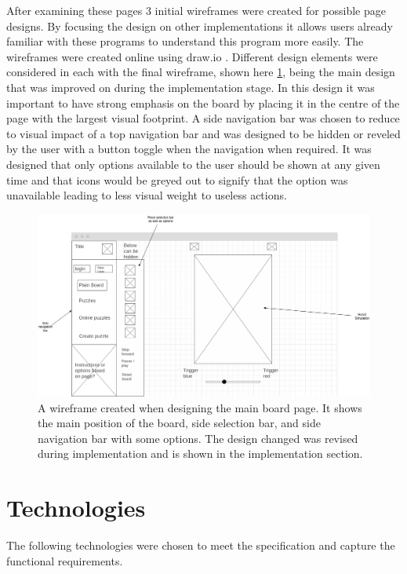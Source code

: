 \documentclass{l4proj}
\begin{document}
After examining these pages 3 initial wireframes were created for possible page designs. By focusing the design on other implementations it allows users already familiar with these programs to understand this program more easily. The wireframes were created online using draw.io \cite{noauthor_flowchart_nodate}. Different design elements were considered in each with the final wireframe, shown here \ref{fig:wireframe}, being the main design that was improved on during the implementation stage. In this design it was important to have strong emphasis on the board by placing it in the centre of the page with the largest visual footprint. A side navigation bar was chosen to reduce to visual impact of a top navigation bar and was designed to be hidden or reveled by the user with a button toggle when the navigation when required. It was designed that only options available to the user should be shown at any given time and that icons would be greyed out to signify that the option was unavailable leading to less visual weight to useless actions.


\begin{figure}
    \centering
    \includegraphics[width=0.7\linewidth]{images/wireframe.png}
    \caption{A wireframe created when designing the main board page. It shows the main position of the board, side selection bar, and side navigation bar with some options. The design changed was revised during implementation and is shown in the implementation section.}
    \label{fig:wireframe}
\end{figure}

\section{Technologies}
The following technologies were chosen to meet the specification and capture the functional requirements.
\end{document}
